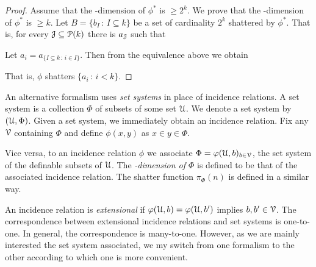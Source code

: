 \documentclass[sputnik.tex]{subfiles}
\begin{document}
\begin{proof}
Assume that the \vc-dimension of $\phi^*$ is $\ge 2^k$.
We prove that the \vc-dimension of $\phi^*$ is $\ge k$.
Let $B=\{b_I\,:\,I\subseteq k\}$ be a set of cardinality $2^k$ shattered by $\phi^*$. 
That is, for every $\EuScript J\subseteq \EuScript P(k)$ there is $a_\EuScript J$ such that


Let $a_i=a_{\{I\subseteq k\,:\, i\in I\}}$. Then from the equivalence above we obtain


That is, $\phi$ shatters $\{a_i\,:\,i<k\}$.
\end{proof}

An alternative formalism uses \emph{set systems\/} in place of incidence relations.
A set system is a collection $\Phi$ of subsets of some set $\EuScript U$.
We denote a set system by $(\EuScript U,\Phi)$.
Given a set system, we immediately obtain an incidence relation.
Fix any $\EuScript V$ containing $\Phi$ and define $\phi(x,y)$ as $x\in y\in\Phi$.

Vice versa, to an incidence relation $\phi$ we associate $\Phi=\varphi(\EuScript U,b)_{b\in\EuScript V}$, the set system of the definable subsets of $\EuScript U$.
The \emph{\vc-dimension of $\Phi$} is defined to be that of the associated incidence relation.
The shatter function \emph{$\pi_\Phi(n)$\/} is defined in a similar way.

An incidence relation is \emph{extensional\/} if $\varphi(\EuScript U,b)=\varphi(\EuScript U,b')$ implies $b,b'\in\EuScript V$.
The correspondence between extensional incidence relations and set systems is one-to-one.
In general, the correspondence is many-to-one.
However, as we are mainly interested the set system associated, we my switch from one formalism to the other according to which one is more convenient.

\end{document}
